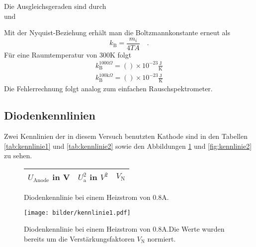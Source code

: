 		Die Ausgleichsgeraden sind durch
		\begin{equation}
			
		\end{equation}
		und
		\begin{equation}
			
		\end{equation}

		Mit der Nyquist-Beziehung erhält man die Boltzmannkonstante erneut als
		\begin{equation}
		k_\text{B}=\frac{m_i}{4 T A} \quad .
		\end{equation}
 		Für eine Raumtemperatur von $300$K folgt
		\begin{align}
		k_\text{B}^{1000\Omega}			=  () \times 10^{-23}\frac{\text{J}}
																			{\text{K}} \\
		k_\text{B}^{100\text{k}\Omega}	=  () \times 10^{-23}\frac{\text{J}}
																			{\text{K}}
		\end{align}
		Die Fehlerrechnung folgt analog zum einfachen Rauschspektrometer.



\clearpage
\subsection{Diodenkennlinien}
	Zwei Kennlinien der in diesem Versuch benutzten Kathode sind in
	den Tabellen \ref{tab:kennlinie1} und \ref{tab:kennlinie2} sowie
	den Abbildungen \ref{fig:kennlinie1} und \ref{fig:kennlinie2} zu
	sehen.

	\begin{figure}[htbp]
	\begin{minipage}{0.4\textwidth}
			\centering
			\begin{tabular}{ccc}
				\toprule \midrule
				$U_\text{Anode}$ in V & $U_\text{a}^2$ in $V^2$
				& $V_\text{N}$\\
				\midrule
				
				\midrule \bottomrule
			\end{tabular}
			\caption{Diodenkennlinie bei einem Heizstrom von
			$0.8$A.}
			\label{tab:kennlinie1}
	\end{minipage}
	\hfill
	\begin{minipage}{0.6\textwidth}
			\centering
			\texttt{[image: bilder/kennlinie1.pdf]}
			\caption{Diodenkennlinie bei einem Heizstrom von
			$0.8$A.Die Werte wurden bereits um die
			Verstärkungsfaktoren $V_\text{N}$ normiert. }
			\label{fig:kennlinie1}
	\end{minipage}
	\end{figure}


